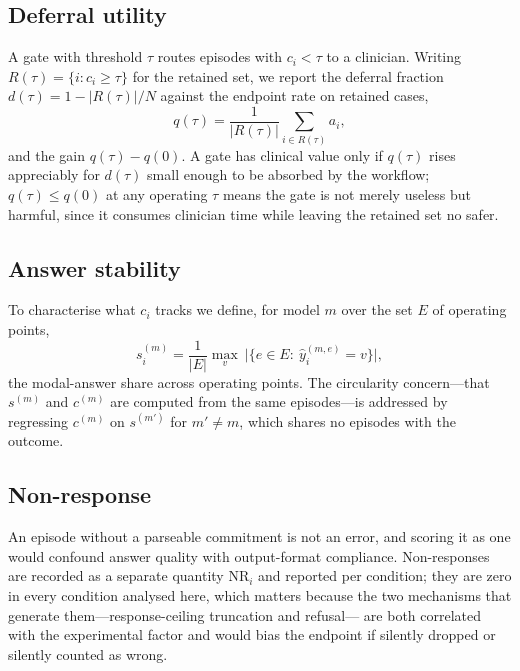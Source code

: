 \documentclass[journal,twoside]{IEEEtran}
\begin{document}
\subsection{Deferral utility}
A gate with threshold $\tau$ routes episodes with $c_i<\tau$ to a clinician. Writing
$R(\tau)=\{i: c_i \ge \tau\}$ for the retained set, we report the deferral fraction
$d(\tau)=1-|R(\tau)|/N$ against the endpoint rate on retained cases,
\begin{equation}
q(\tau)=\frac{1}{|R(\tau)|}\sum_{i \in R(\tau)} a_i,
\label{eq:dca}
\end{equation}
and the gain $q(\tau)-q(0)$. A gate has clinical value only if $q(\tau)$ rises appreciably for
$d(\tau)$ small enough to be absorbed by the workflow; $q(\tau) \le q(0)$ at any operating $\tau$
means the gate is not merely useless but harmful, since it consumes clinician time while leaving the
retained set no safer.

\subsection{Answer stability}
To characterise what $c_i$ tracks we define, for model $m$ over the set $E$ of operating points,
\begin{equation}
s_i^{(m)} = \frac{1}{|E|}\max_{v}\ \big|\{e \in E:\ \hat{y}_i^{(m,e)} = v\}\big|,
\label{eq:stab}
\end{equation}
the modal-answer share across operating points. The circularity concern---that $s^{(m)}$ and
$c^{(m)}$ are computed from the same episodes---is addressed by regressing $c^{(m)}$ on
$s^{(m')}$ for $m'\neq m$, which shares no episodes with the outcome.

\subsection{Non-response}
An episode without a parseable commitment is not an error, and scoring it as one would confound
answer quality with output-format compliance. Non-responses are recorded as a separate quantity
$\mathrm{NR}_i$ and reported per condition; they are zero in every condition analysed here, which
matters because the two mechanisms that generate them---response-ceiling truncation and refusal---
are both correlated with the experimental factor and would bias the endpoint if silently dropped or
silently counted as wrong.
\end{document}
